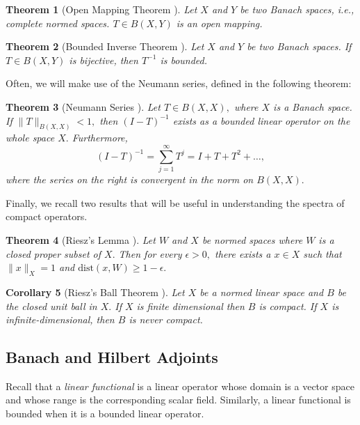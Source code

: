 \documentclass[12pt,a4paper]{article}
\theoremstyle{boldthm}
\newtheorem{theorem}{Theorem}[section]
\newtheorem{corollary}[theorem]{Corollary}
\theoremstyle{bolddefn}
\begin{document}
\begin{theorem}[{Open Mapping Theorem \cite[4.12-2]{krey}}] 
    Let $X$ and $Y$ be two Banach spaces, i.e., complete normed spaces. $T \in B(X, Y)$ is an open mapping.
\end{theorem}

\begin{theorem}[{Bounded Inverse Theorem \cite[4.12-2]{krey}}]  \label{BIT}
     Let $X$ and $Y$ be two Banach spaces. If $T \in B(X, Y)$ is bijective, then $T^{-1}$ is bounded. 
\end{theorem}


Often, we will make use of the Neumann series, defined in the following theorem:

\begin{theorem}[{Neumann Series \cite[7.3-1]{krey}}]  \label{neum}
    Let $T \in B(X, X),$ where $X$ is a Banach space. If $\|T\|_{B(X, X)} < 1,$ then $(I - T)^{-1}$ exists as a bounded linear operator on the whole space $X.$ Furthermore, 
    \begin{equation}
        (I - T)^{-1} = \sum_{j=1}^{\infty} T^j = I + T + T^2 + \dots,
    \end{equation}
    where the series on the right is convergent in the norm on $B(X, X).$
\end{theorem}


Finally, we recall two results that will be useful in understanding the spectra of compact operators. 
\begin{theorem}[Riesz's Lemma \cite{umberto}] \label{RL}
    Let $W$ and $X$ be normed spaces where $W$ is a closed proper subset of $X.$ Then for every $\epsilon > 0,$ there exists a $x \in X$ such that $\|x\|_X = 1$ and $\text{dist}(x, W) \ge 1-\epsilon.$
\end{theorem}

\begin{corollary}[{Riesz's Ball Theorem \cite[2.5-5]{krey}}] \label{ball}
    Let $X$ be a normed linear space and $B$ be the closed unit ball in $X.$ If $X$ is finite dimensional then $B$ is compact. If $X$ is infinite-dimensional, then $B$ is never compact.
\end{corollary}


\subsection{Banach and Hilbert Adjoints}

Recall that a \textit{linear functional} is a linear operator whose domain is a vector space and whose range is the corresponding scalar field. Similarly, a linear functional is bounded when it is a bounded linear operator. 
\end{document}
